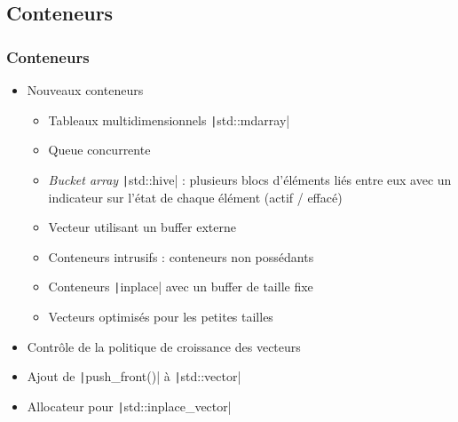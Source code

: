 \documentclass[C++.tex]{subfiles}
\begin{document}
\subsection*{Conteneurs}
\begin{frame}[fragile]
	\frametitle{Conteneurs}
	\begin{itemize}
		\item Nouveaux conteneurs
		\begin{itemize}
			\item Tableaux multidimensionnels \texttt|std::mdarray|
			\item Queue concurrente
			\item \textit{Bucket array} \texttt|std::hive| : plusieurs blocs d'éléments liés entre eux avec un indicateur sur l'état de chaque élément (actif / effacé)
			\item Vecteur utilisant un buffer externe
			\item Conteneurs intrusifs : conteneurs non possédants


			\item Conteneurs \texttt|inplace| avec un buffer de taille fixe
			\item Vecteurs optimisés pour les petites tailles
		\end{itemize}
		\item Contrôle de la politique de croissance des vecteurs
		\item Ajout de \texttt|push_front()| à \texttt|std::vector|
		\item Allocateur pour \texttt|std::inplace_vector|
	\end{itemize}

\end{frame}
\end{document}
